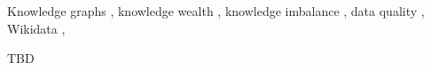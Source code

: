 \documentclass[
]{ceurart}
\begin{document}
\begin{keywords}
  Knowledge graphs \sep
  knowledge wealth \sep
  knowledge imbalance \sep
  data quality \sep
  Wikidata \sep
\end{keywords}

\maketitle














\begin{acknowledgments}

TBD

\end{acknowledgments}


\end{document}
